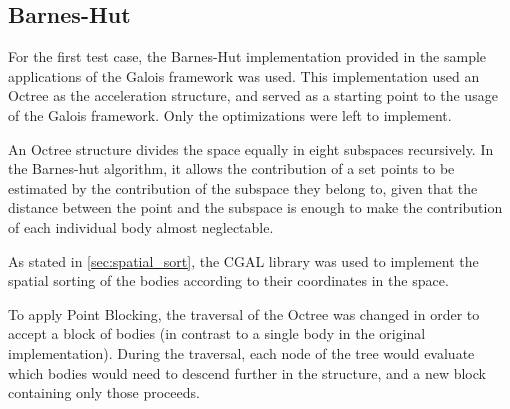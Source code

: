 \subsection{Barnes-Hut}
\label{sec:cases:barnes}

For the first test case, the Barnes-Hut implementation provided in the sample applications of the Galois framework was used.
This implementation used an Octree as the acceleration structure, and served as a starting point to the usage of the Galois framework. Only the optimizations were left to implement.

An Octree structure divides the space equally in eight subspaces recursively. In the Barnes-hut algorithm, it allows the contribution of a set points to be estimated by the contribution of the subspace they belong to, given that the distance between the point and the subspace is enough to make the contribution of each individual body almost neglectable.

As stated in \cref{sec:spatial_sort}, the CGAL library was used to implement the spatial sorting of the bodies according to their coordinates in the space.

To apply Point Blocking, the traversal of the Octree was changed in order to accept a block of bodies (in contrast to a single body in the original implementation). During the traversal, each node of the tree would evaluate which bodies would need to descend further in the structure, and a new block containing only those proceeds.